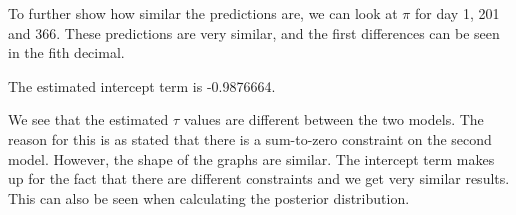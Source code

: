 \documentclass[
]{article}
\newenvironment{Shaded}{\begin{snugshade}}{\end{snugshade}}
\newcommand{\NormalTok}[1]{#1}
\newcommand{\OtherTok}[1]{\textcolor[rgb]{0.56,0.35,0.01}{#1}}
\newcommand{\SpecialCharTok}[1]{\textcolor[rgb]{0.00,0.00,0.00}{#1}}
\begin{document}
\begin{Shaded}
\end{Shaded}

To further show how similar the predictions are, we can look at \(\pi\) for day 1, 201 and 366.
These predictions are very similar, and the first differences can be seen in the fith decimal.

The estimated intercept term is -0.9876664.

We see that the estimated \(\tau\) values are different between the two models. The reason for this is as stated that there is a sum-to-zero constraint on the second model. However, the shape of the graphs are similar. The intercept term makes up for the fact that there are different constraints and we get very similar results. This can also be seen when calculating the posterior distribution.
\end{document}
